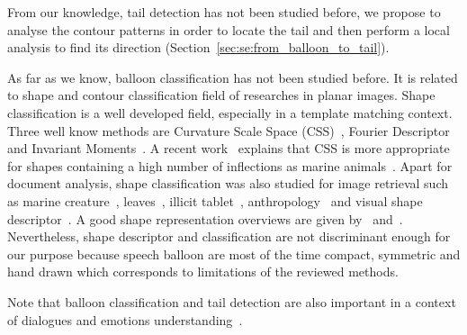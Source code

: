 From our knowledge, tail detection has not been studied before, we propose to analyse the contour patterns in order to locate the tail and then perform a local analysis to find its direction (Section~\ref{sec:se:from_balloon_to_tail}).

As far as we know, balloon classification has not been studied before.
It is related to shape and contour classification field of researches in planar images.
Shape classification is a well developed field, especially in a template matching context.
Three well know methods are Curvature Scale Space (CSS)~\cite{Abbasi1999}, Fourier Descriptor~\cite{Zahn1972} and Invariant Moments~\cite{Hu1962}.
A recent work~\cite{Lopatka2013} explains that CSS is more appropriate for shapes containing a high number of inflections as marine animals~\cite{Abbasi1999}.
Apart for document analysis, shape classification was also studied for image retrieval such as marine creature~\cite{Mokhtarian2002}, leaves~\cite{Wang2003}, illicit tablet~\cite{Lopatka2013}, anthropology~\cite{Keogh2006} and visual shape descriptor~\cite{Bober01}. A good shape representation overviews are given by~\cite{veltkamp2000} and~\cite{Zhang2004}. 
Nevertheless, shape descriptor and classification are not discriminant enough for our purpose because speech balloon are most of the time compact, symmetric and hand drawn which corresponds to limitations of the reviewed methods.

Note that balloon classification and tail detection are also important in a context of dialogues and emotions understanding~\cite{millidge2009comic}.






